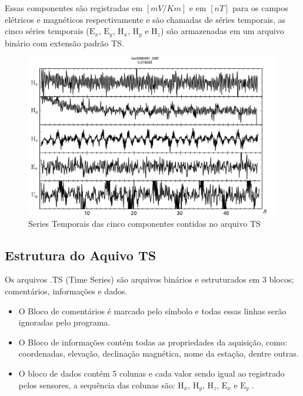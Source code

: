         Essas componentes são registradas em $[mV/Km]$ e em $[nT]$ para os campos elétricos e magnéticos respectivamente e são chamadas de séries temporais, as cinco séries temporais ($\textrm{E}_x,\, \textrm{E}_y, \, \textrm{H}_x, \, \textrm{H}_y \, \, \textrm{e} \, \, \textrm{H}_z$) são armazenadas em um arquivo binário com extensão padrão TS.
        
        \begin{figure}[H]
            \centering
	        \caption{Series Temporais das cinco componentes contidas no arquivo TS}
	        \begin{center}
	        \includegraphics[width=13cm]{texto/fig/campos_divididos.png} 
	        \end{center}
	    \end{figure}
        
        \subsection{Estrutura do Aquivo TS}
            \label{subsec-arquivoTS}    
            Os arquivos .TS (Time Series) são arquivos binários e estruturados em 3 blocos; comentários, informações e dados.
            \begin{itemize}
             \item O Bloco de comentários é marcado pelo símbolo \en{\#} e todas essas linhas serão ignoradas pelo programa.
             \item   O Bloco de informações contém todas as propriedades da aquisição, como: coordenadas, elevação, declinação magnética, nome da estação, dentre outras.
             \item O bloco de dados contém 5 colunas e cada valor sendo igual ao registrado pelos sensores, a sequência das colunas são: $\textrm{H}_x,\, \textrm{H}_y, \, \textrm{H}_z, \, \textrm{E}_x \, \, \textrm{e} \, \, \textrm{E}_y$ \cite{tsformat}.
            \end{itemize}

